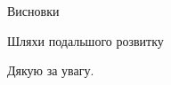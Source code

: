 \begin{frame}{Висновки}
	\manimate
\end{frame}

\begin{frame}{Шляхи подальшого розвитку}
	\manimate
\end{frame}

\begin{frame}
	\manimate
	\centering
	\Large Дякую за увагу.

\end{frame}